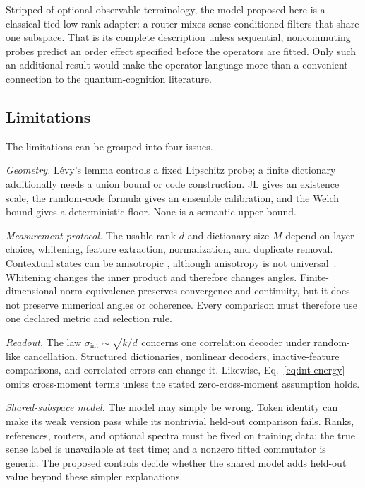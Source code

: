 \documentclass[
  aps,
  reprint,
  superscriptaddress,
  floatfix,
  nofootinbib,
  longbibliography
]{revtex4-2}
\newcommand{\Msem}{M}
\newcommand{\sint}{\sigma_{\mathrm{int}}}
\begin{document}
Stripped of optional observable terminology, the model proposed here is a
classical tied low-rank adapter: a router mixes sense-conditioned filters that
share one subspace.  That is its complete description unless sequential,
noncommuting probes predict an order effect specified before the operators are
fitted.  Only such an additional result would make the operator language more
than a convenient connection to the quantum-cognition literature.

\subsection{Limitations}
\label{sec:limitations}

The limitations can be grouped into four issues.

\emph{Geometry.}  L\'evy's lemma controls a fixed Lipschitz probe; a finite
dictionary additionally needs a union bound or code construction.  JL gives
an existence scale, the random-code formula gives an ensemble calibration,
and the Welch bound gives a deterministic floor.  None is a semantic upper
bound.

\emph{Measurement protocol.}  The usable rank $d$ and dictionary size $\Msem$
depend on layer choice, whitening, feature extraction, normalization, and
duplicate removal.  Contextual states can be anisotropic
\cite{ethayarajh2019,gao2019representation,mu2018allbutthetop,razzhigaev2024shape},
although anisotropy is not universal~\cite{machina2024anisotropy}.  Whitening
changes the inner product and therefore changes angles.  Finite-dimensional
norm equivalence preserves convergence and continuity, but it does not
preserve numerical angles or coherence.  Every comparison must therefore use
one declared metric and selection rule.

\emph{Readout.}  The law $\sint\sim\sqrt{k/d}$ concerns one correlation
decoder under random-like cancellation.  Structured dictionaries, nonlinear
decoders, inactive-feature comparisons, and correlated errors can change it.
Likewise, Eq.~\eqref{eq:int-energy} omits cross-moment terms unless the stated
zero-cross-moment assumption holds.

\emph{Shared-subspace model.}  The model may simply be wrong.  Token identity
can make its weak version pass while its nontrivial held-out comparison fails.
Ranks, references, routers, and optional spectra must be fixed on training
data; the true sense label is unavailable at test time; and a nonzero fitted
commutator is generic.  The proposed controls decide whether the shared model
adds held-out value beyond these simpler explanations.
\end{document}
